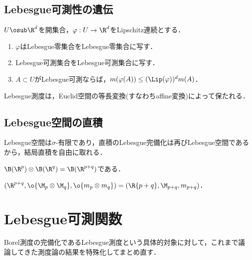 \documentclass[uplatex, dvipdfmx]{jsreport}
\begin{document}
\subsection{Lebesgue可測性の遺伝}

\begin{theorem}
    $U\osub\R^d$を開集合，$\varphi:U\to\R^d$をLipschitz連続とする．
    \begin{enumerate}
        \item $\varphi$はLebesgue零集合をLebesgue零集合に写す．
        \item Lebesgue可測集合をLebesgue可測集合に写す．
        \item $A\subset U$がLebesgue可測ならば，$m(\varphi(A))\le(\Lip(\varphi))^dm(A)$．
    \end{enumerate}
\end{theorem}

\begin{corollary}
    Lebesgue測度は，Euclid空間の等長変換(すなわちaffine変換)によって保たれる．
\end{corollary}

\subsection{Lebesgue空間の直積}

\begin{tcolorbox}[colframe=ForestGreen, colback=ForestGreen!10!white,breakable,colbacktitle=ForestGreen!40!white,coltitle=black,fonttitle=\bfseries\sffamily,
title=]
    Lebesgue空間は$\sigma$-有限であり，直積のLebesgue完備化は再びLebesgue空間であるから，結局直積を自由に取れる．
\end{tcolorbox}

\begin{lemma}
    $\B(\R^p)\otimes\B(\R^q)=\B(\R^{p+q})$である．
\end{lemma}

\begin{theorem}[Lebesgue空間の直積はLebesgue空間]
    $(\R^{p+q},\o{\M_p\otimes\M_q},\o{m_p\otimes m_q})=(\R{p+q},\M_{p+q},m_{p+q})$．
\end{theorem}

\section{Lebesgue可測関数}

\begin{tcolorbox}[colframe=ForestGreen, colback=ForestGreen!10!white,breakable,colbacktitle=ForestGreen!40!white,coltitle=black,fonttitle=\bfseries\sffamily,
title=]
    Borel測度の完備化であるLebesgue測度という具体的対象に対して，これまで議論してきた測度論の結果を特殊化してまとめ直す．
\end{tcolorbox}
\end{document}
